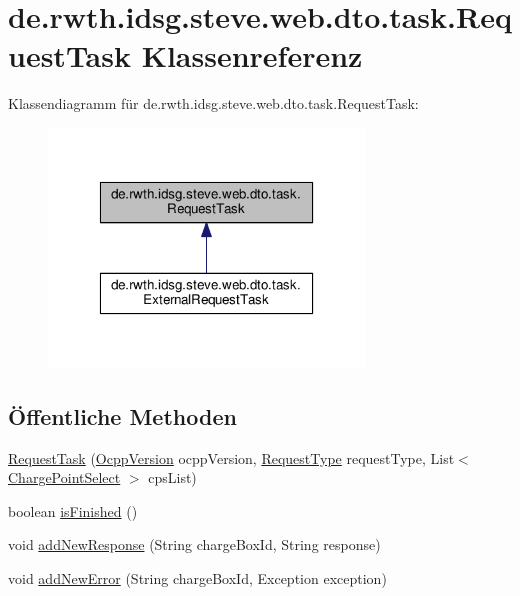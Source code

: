 \hypertarget{classde_1_1rwth_1_1idsg_1_1steve_1_1web_1_1dto_1_1task_1_1_request_task}{\section{de.\-rwth.\-idsg.\-steve.\-web.\-dto.\-task.\-Request\-Task Klassenreferenz}
\label{classde_1_1rwth_1_1idsg_1_1steve_1_1web_1_1dto_1_1task_1_1_request_task}
}


Klassendiagramm für de.\-rwth.\-idsg.\-steve.\-web.\-dto.\-task.\-Request\-Task\-:\nopagebreak
\begin{figure}[H]
\begin{center}
\leavevmode
\includegraphics[width=238pt]{classde_1_1rwth_1_1idsg_1_1steve_1_1web_1_1dto_1_1task_1_1_request_task__inherit__graph}
\end{center}
\end{figure}
\subsection*{Öffentliche Methoden}
\begin{DoxyCompactItemize}
\item 
\hyperlink{classde_1_1rwth_1_1idsg_1_1steve_1_1web_1_1dto_1_1task_1_1_request_task_a794be744a83af201c74a16d28a41ce83}{Request\-Task} (\hyperlink{enumde_1_1rwth_1_1idsg_1_1steve_1_1ocpp_1_1_ocpp_version}{Ocpp\-Version} ocpp\-Version, \hyperlink{interfacede_1_1rwth_1_1idsg_1_1steve_1_1ocpp_1_1_request_type}{Request\-Type} request\-Type, List$<$ \hyperlink{classde_1_1rwth_1_1idsg_1_1steve_1_1repository_1_1dto_1_1_charge_point_select}{Charge\-Point\-Select} $>$ cps\-List)
\item 
boolean \hyperlink{classde_1_1rwth_1_1idsg_1_1steve_1_1web_1_1dto_1_1task_1_1_request_task_ac2c02fb018174b7f1d0c58b549c19efa}{is\-Finished} ()
\item 
void \hyperlink{classde_1_1rwth_1_1idsg_1_1steve_1_1web_1_1dto_1_1task_1_1_request_task_a2e5538a28d3c0df0e0afedda84f58789}{add\-New\-Response} (String charge\-Box\-Id, String response)
\item 
void \hyperlink{classde_1_1rwth_1_1idsg_1_1steve_1_1web_1_1dto_1_1task_1_1_request_task_ae0adc343b8e51aed64a8ce79f6739b8c}{add\-New\-Error} (String charge\-Box\-Id, Exception exception)
\end{DoxyCompactItemize}


